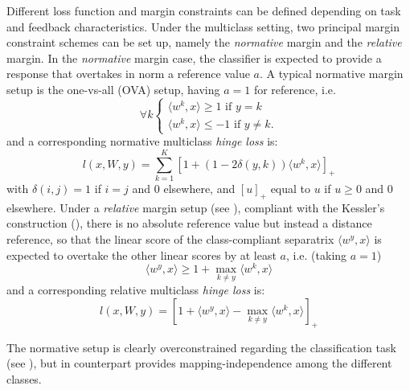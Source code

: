\documentclass[preprint,12pt,authoryear]{elsarticle}
\begin{document}
Different loss function and margin constraints can be defined depending on task and feedback characteristics. 
Under the multiclass setting, two principal margin constraint schemes can be set up, namely the \emph{normative} margin and the \emph{relative} margin. In the \emph{normative} margin case, the classifier is expected to provide a response that overtakes in norm a reference value $a$. A typical normative margin setup is the one-vs-all (OVA) setup, having  $a = 1$ for reference,  i.e. $$\forall k \left\{
\begin{array}{l}
\langle w^k, x \rangle \geq 1 \text{ if } y = k \\
\langle w^k, x \rangle \leq -1 \text{ if }y \neq k.
\end{array}
\right. 
$$
and a corresponding normative multiclass \emph{hinge loss} is:  
$$ l(x,W,y) = \sum_{k=1}^K \left[1 + (1 - 2 \delta(y,k)) \langle w^k,x \rangle\right]_+
$$
with $\delta(i,j) =1$ if $i = j$ and 0 elsewhere, and $[u]_+$ equal to $u$ if $u\geq 0$ and 0 elsewhere.
Under  a \emph{relative} margin setup (see \cite{crammer2003ultraconservative}), compliant with the Kessler's construction (\cite{duda1973pattern}), there is no absolute reference value but instead a distance reference, so that the linear score of the class-compliant separatrix $\langle w^y, x\rangle$ is expected to overtake  the other linear scores by at least $a$, i.e. (taking $a=1$)
$$ \langle w^y, x \rangle \geq 1 + \max_{k \neq y} \langle w^k, x \rangle  $$
and a corresponding relative multiclass \emph{hinge loss} is:
$$ l (x,W,y) =  \left[ 1 +  \langle w^y, x \rangle - \max_{k \neq y} \langle w^k, x\rangle\right]_+$$

The normative setup is clearly overconstrained regarding the classification task (see \cite{crammer2003ultraconservative}), but in counterpart provides mapping-independence among the different classes.

\end{document}
